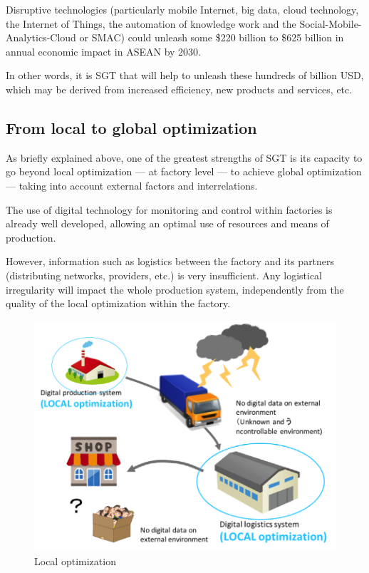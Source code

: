 \begin{displayquote}

Disruptive technologies (particularly mobile Internet, big data, cloud technology, the Internet of Things, the automation of knowledge work and the Social-Mobile-Analytics-Cloud or SMAC) could unleash some \$220 billion to \$625 billion in annual economic impact in ASEAN by 2030.

\end{displayquote}

In other words, it is SGT that will help to unleash these hundreds of billion USD, which may be derived from increased efficiency, new products and services, etc.

\subsection{From local to global optimization} \label{optimization}

As briefly explained above, one of the greatest strengths of SGT is its capacity to go beyond local optimization --- at factory level --- to achieve global optimization --- taking into account external factors and interrelations.

\vspace{0.4 cm}

The use of digital technology for monitoring and control within factories is already well developed, allowing an optimal use of resources and means of production.

However, information such as logistics between the factory and its partners (distributing networks, providers, etc.) is very insufficient. Any logistical irregularity will impact the whole production system, independently from the quality of the local optimization within the factory.

\begin{figure}[H]
\begin{center}
\includegraphics[width = 0.7\linewidth]{Figures/local_optimization.png}
\end{center}
\caption{Local optimization}
\label{local_optimization}
\end{figure}

